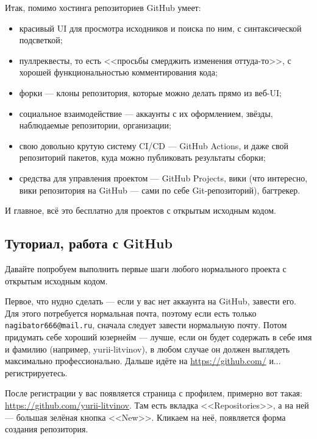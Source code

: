 \documentclass{../../text-style}
\begin{document}
Итак, помимо хостинга репозиториев GitHub умеет:

\begin{itemize}
    \item красивый UI для просмотра исходников и поиска по ним, с синтаксической подсветкой;
    \item пуллреквесты, то есть <<просьбы смерджить изменения оттуда-то>>, с хорошей функциональностью комментирования кода;
    \item форки --- клоны репозитория, которые можно делать прямо из веб-UI;
    \item социальное взаимодействие --- аккаунты с их оформлением, звёзды, наблюдаемые репозитории, организации;
    \item свою довольно крутую систему CI/CD --- GitHub Actions, и даже свой репозиторий пакетов, куда можно публиковать результаты сборки;
    \item средства для управления проектом --- GitHub Projects, вики (что интересно, вики репозитория на GitHub --- сами по себе Git-репозиторий), багтрекер.
\end{itemize}

И главное, всё это бесплатно для проектов с открытым исходным кодом.

\subsection{Туториал, работа с GitHub}

Давайте попробуем выполнить первые шаги любого нормального проекта с открытым исходным кодом.

Первое, что нудно сделать --- если у вас нет аккаунта на GitHub, завести его. Для этого потребуется нормальная почта, поэтому если есть только \verb|nagibator666@mail.ru|, сначала следует завести нормальную почту. Потом придумать себе хороший юзернейм --- лучше, если он будет содержать в себе имя и фамилию (например, yurii-litvinov), в любом случае он должен выглядеть максимально профессионально. Дальше идёте на \url{https://github.com/} и... регистрируетесь.

После регистрации у вас появляется страница с профилем, примерно вот такая: \url{https://github.com/yurii-litvinov}. Там есть вкладка <<Repositories>>, а на ней --- большая зелёная кнопка <<New>>. Кликаем на неё, появляется форма создания репозитория.
\end{document}
